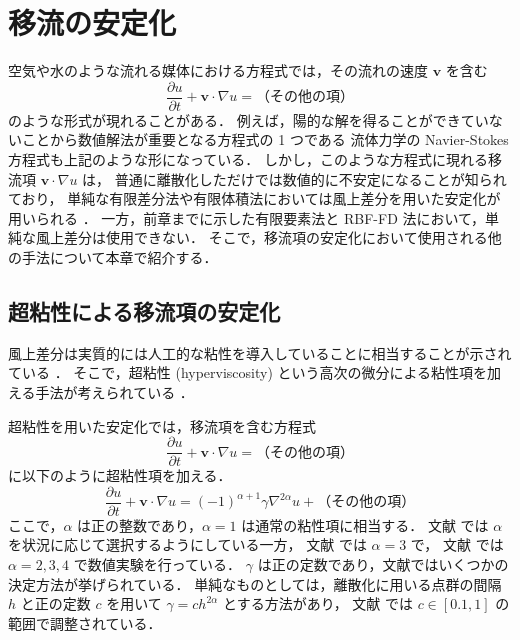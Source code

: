 %

\chapter{移流の安定化}\label{chap:pde_convection}

空気や水のような流れる媒体における方程式では，その流れの速度 $\bm{v}$ を含む
\begin{equation}
    \frac{\partial u}{\partial t} + \bm{v} \cdot \nabla u = \text{（その他の項）}
\end{equation}
のような形式が現れることがある．
例えば，陽的な解を得ることができていないことから数値解法が重要となる方程式の 1 つである
流体力学の Navier-Stokes 方程式も上記のような形になっている．
しかし，このような方程式に現れる移流項 $\bm{v} \cdot \nabla u$ は，
普通に離散化しただけでは数値的に不安定になることが知られており，
単純な有限差分法や有限体積法においては風上差分を用いた安定化が用いられる \cite{Tabata1994,Arakawa1994}．
一方，前章までに示した有限要素法と RBF-FD 法において，単純な風上差分は使用できない．
そこで，移流項の安定化において使用される他の手法について本章で紹介する．

\section{超粘性による移流項の安定化}\label{sec:pde_convection_hyperviscosity}

風上差分は実質的には人工的な粘性を導入していることに相当することが示されている \cite{Arakawa1994}．
そこで，超粘性 (hyperviscosity) という高次の微分による粘性項を加える手法が考えられている%
\cite{Shankar2018,Vaupotic2024,Rot2026}．

超粘性を用いた安定化では，移流項を含む方程式
\begin{equation}
    \frac{\partial u}{\partial t} + \bm{v} \cdot \nabla u = \text{（その他の項）}
\end{equation}
に以下のように超粘性項を加える．
\begin{equation}
    \frac{\partial u}{\partial t} + \bm{v} \cdot \nabla u = (-1)^{\alpha + 1} \gamma \nabla^{2\alpha} u + \text{（その他の項）}
\end{equation}
ここで，$\alpha$ は正の整数であり，$\alpha = 1$ は通常の粘性項に相当する．
文献 \cite{Shankar2018} では $\alpha$ を状況に応じて選択するようにしている一方，
文献 \cite{Vaupotic2024} では $\alpha=3$ で，
文献 \cite{Rot2026} では $\alpha=2,3,4$ で数値実験を行っている．
$\gamma$ は正の定数であり，文献ではいくつかの決定方法が挙げられている．
単純なものとしては，離散化に用いる点群の間隔 $h$ と正の定数 $c$ を用いて
$\gamma = c h^{2\alpha}$ とする方法があり，
文献 \cite{Rot2026} では $c \in [0.1, 1]$ の範囲で調整されている．
